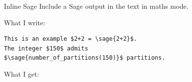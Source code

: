 \documentclass{beamer}
\begin{document}
	\begin{frame}[fragile]{Inline Sage}
		Include a Sage output in the text in maths mode. \newline
		
		What I write:
		\begin{Verbatim}[frame=single]
This is an example $2+2 = \sage{2+2}$.
The integer $150$ admits 
$\sage{number_of_partitions(150)}$ partitions.
		\end{Verbatim}

		\vspace{.5cm}
		
		What I get: 
		
		
	\end{frame}
\end{document}
